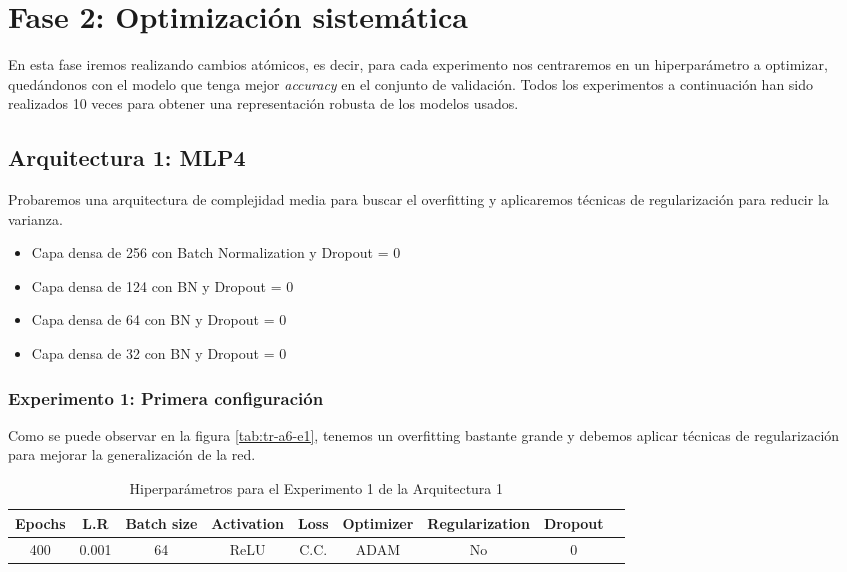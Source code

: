 \documentclass{article}
\begin{document}
\section{Fase 2: Optimizaci\'on sistem\'atica}
	En esta fase iremos realizando cambios at\'omicos, es decir, para cada experimento nos centraremos en un hiperpar\'ametro a optimizar, qued\'andonos con el modelo que tenga mejor \textit{accuracy} en el conjunto de validaci\'on. Todos los experimentos a continuaci\'on han sido realizados 10 veces para obtener una representaci\'on robusta de los modelos usados.
	\subsection{Arquitectura 1: MLP4}
			Probaremos una arquitectura de complejidad media para buscar el overfitting y aplicaremos t\'ecnicas de regularizaci\'on para reducir la varianza. 
			\begin{itemize}
			    \item Capa densa de 256 con Batch Normalization y Dropout = 0
                \item Capa densa de 124 con BN y Dropout = 0
                \item Capa densa de 64 con BN y Dropout = 0
                \item Capa densa de 32 con BN y Dropout = 0
			\end{itemize}
		\subsubsection{Experimento 1: Primera configuraci\'on}
        \label{s-a6-e1}
            Como se puede observar en la figura \ref{tab:tr-a6-e1}, tenemos un overfitting bastante grande y debemos aplicar t\'ecnicas de regularizaci\'on para mejorar la generalizaci\'on de la red. 
            \begin{table}[!h]
				\begin{tabular}{|c|c|c|c|c|c|c|c|c|}
					\textbf{Epochs}&\textbf{L.R}&\textbf{Batch size}&\textbf{Activation}&\textbf{Loss}&\textbf{Optimizer}&\textbf{Regularization}&\textbf{Dropout}   \\ \hline
					400 & 0.001 & 64 & ReLU & C.C. & ADAM & No & 0 
				\end{tabular}
				\caption{Hiperpar\'ametros para el Experimento 1 de la Arquitectura 1}
				\label{tab:hip-a6-e1}
			\end{table}
   
\end{document}
